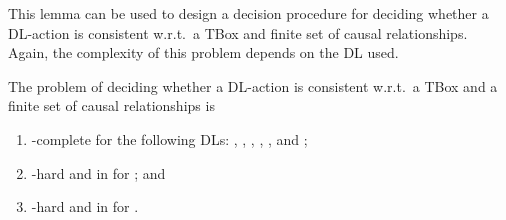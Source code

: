 \noindent
This lemma can be used to design a decision procedure for deciding whether a
DL-action is consistent w.r.t.\ a TBox and finite set of causal relationships.
Again, the complexity of this problem depends on the DL used.

\begin{theorem}\label{thm:consistency-complexity-tbox}
    The problem of deciding whether a DL-action is consistent w.r.t.\ a TBox and
    a finite set of causal relationships is
    \begin{enumerate}
        \item\label{enum:part-tbox-alc-o-q-i-qo-io}
            \ExpTime-complete for the following DLs: \ALC, \ALCO, \ALCQ, \ALCI,
            \ALCQO, and \ALCIO;
        \item\label{enum:part-tbox-alcqi}
            \ExpTime-hard and in \coNExpTime for \ALCQI; and
        \item\label{enum:part-tbox-alcqio}
            \coNExpTime-hard and in \PTimeToNExpTime for \ALCQIO.
    \end{enumerate}
\end{theorem}

